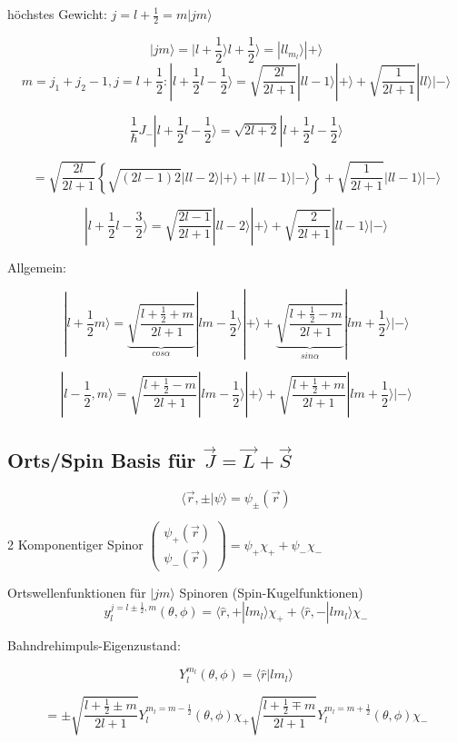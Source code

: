 höchstes Gewicht: \(j=l+\frac 1 2 = m | jm\rangle\)

\[ | jm\rangle = |l+\frac 1 2 \rangle l+\frac 1 2\rangle = | l l_{m_l}\rangle|+\rangle \]
\[ m= j_1+j_2-1, j=l+\frac 1 2: | l+\frac 1 2 l-\frac 1
2\rangle=\sqrt{\frac {2l}{2l+1} }| l l- 1\rangle|+\rangle + \sqrt{\frac {1}{2l+1} }| l l\rangle|-\rangle\]

\[\frac 1 \hbar J_-|l+\frac 1 2 l-\frac 1 2\rangle =\sqrt{2l+2}|l+\frac 1 2 l-\frac 1 2\rangle\]

\[ = \sqrt{\frac {2l}{2l+1}}\left\{ \sqrt{(2l-1)2}| ll-2\rangle|+\rangle + | l l-1\rangle|-\rangle  \right\} +
  \sqrt{\frac {1}{2l+1} } | l l-1\rangle|-\rangle
\]



\[ |l+\frac 1 2 l-\frac 3 2\rangle =  \sqrt{\frac {2l-1}{2l+1}}| ll-2\rangle|+\rangle+\sqrt{\frac {2}{2l+1}}| l l-1\rangle|-\rangle\]


Allgemein:

\[  |l+\frac 1 2 m\rangle = \underbrace{ \sqrt{\frac {l+\frac 1 2+m}{2l+1}}}_{cos\alpha}| lm-\frac 1 2\rangle|+\rangle + \underbrace{\sqrt{\frac {l+\frac 1 2-m}{2l+1}}}_{sin\alpha}| lm+\frac 1 2\rangle|-\rangle\]

\[  |l-\frac 1 2, m\rangle = \sqrt{\frac {l+\frac 1 2-m}{2l+1}}| lm-\frac 1 2\rangle|+\rangle + \sqrt{\frac {l+\frac 1 2+m}{2l+1}}| lm+\frac 1 2\rangle|-\rangle\]


\subsection{Orts/Spin Basis für \(\vec J = \vec L+\vec S\)}

\[ \langle \vec r,\pm | \psi \rangle = \psi_\pm(\vec r) \]

2 Komponentiger Spinor \(\begin{pmatrix} \psi_+(\vec r) \\ \psi_-(\vec r) \end{pmatrix} = \psi_+\chi_+ + \psi_-\chi_-\)

Ortswellenfunktionen für \(|j m\rangle\) Spinoren (Spin-Kugelfunktionen)
\[y^{j= l\pm\frac 1 2,m}_l(\theta,\phi) =\langle \hat r, + | l m_l\rangle\chi_++\langle \hat r ,- | l m_l\rangle\chi_- \]

Bahndrehimpuls-Eigenzustand:

\[ Y^{m_l}_l(\theta,\phi) = \langle \hat r | l m_l\rangle \]

\[=\pm \sqrt{\frac {l+\frac 1 2\pm m}{2l+1}} Y^{m_l=m-\frac 1 2}_l(\theta,\phi)\chi_
+ \sqrt{\frac {l+\frac 1 2\mp m}{2l+1}} Y^{m_l=m+\frac 1 2}_l(\theta,\phi)\chi_-
\]

